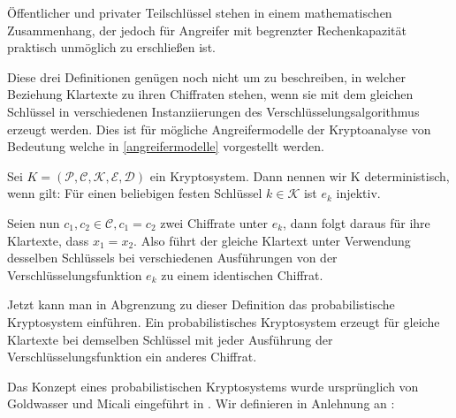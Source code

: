 Öffentlicher und privater Teilschlüssel stehen in einem mathematischen Zusammenhang, der jedoch für Angreifer mit begrenzter Rechenkapazität praktisch unmöglich zu erschließen ist.

Diese drei Definitionen genügen noch nicht um zu beschreiben, in welcher Beziehung Klartexte zu ihren Chiffraten stehen, wenn sie mit dem gleichen Schlüssel in verschiedenen Instanziierungen des Verschlüsselungsalgorithmus erzeugt werden. Dies ist für mögliche Angreifermodelle der Kryptoanalyse von Bedeutung welche in \ref{angreifermodelle} vorgestellt werden.

\begin{theorem}[Deterministisches Kryptosystem]
	Sei $K = (\mathcal{P},\mathcal{C},\mathcal{K},\mathcal{E},\mathcal{D})$ ein Kryptosystem. Dann nennen wir K deterministisch, wenn gilt: Für einen beliebigen festen Schlüssel $k\in\mathcal{K}$ ist $e_k$ injektiv.
\end{theorem}

Seien nun $c_1,c_2\in\mathcal{C}, c_1= c_2$ zwei Chiffrate unter $e_k$, dann folgt daraus für ihre Klartexte, dass $x_1= x_2$. Also führt der gleiche Klartext unter Verwendung desselben Schlüssels bei verschiedenen Ausführungen von der Verschlüsselungsfunktion $e_k$ zu einem identischen Chiffrat.

Jetzt kann man in Abgrenzung zu dieser Definition das probabilistische Kryptosystem einführen. Ein probabilistisches Kryptosystem erzeugt für gleiche Klartexte bei demselben Schlüssel mit jeder Ausführung der Verschlüsselungsfunktion ein  
anderes Chiffrat.

Das Konzept eines probabilistischen Kryptosystems wurde ursprünglich von Goldwasser und Micali eingeführt in \cite{goldwasser1984probabilistic}. Wir definieren in Anlehnung an \cite[p.345]{stinson2006cryptography}:

